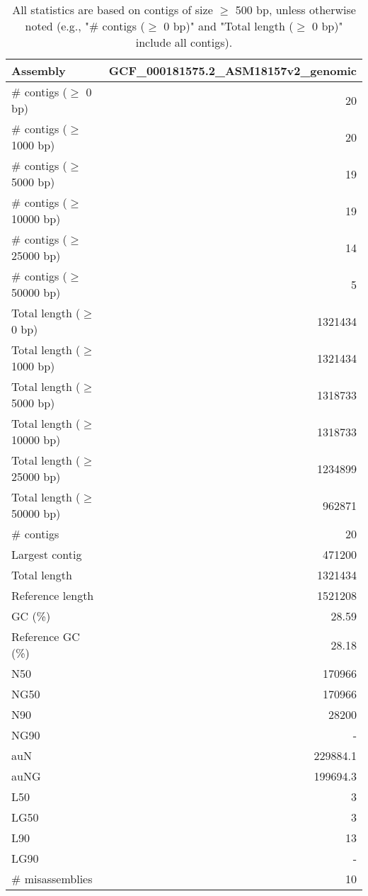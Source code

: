 \documentclass[12pt,a4paper]{article}
\begin{document}
\begin{table}[ht]
\begin{center}
\caption{All statistics are based on contigs of size $\geq$ 500 bp, unless otherwise noted (e.g., "\# contigs ($\geq$ 0 bp)" and "Total length ($\geq$ 0 bp)" include all contigs).}
\begin{tabular}{|l*{1}{|r}|}
\hline
Assembly & GCF\_000181575.2\_ASM18157v2\_genomic \\ \hline
\# contigs ($\geq$ 0 bp) & 20 \\ \hline
\# contigs ($\geq$ 1000 bp) & 20 \\ \hline
\# contigs ($\geq$ 5000 bp) & 19 \\ \hline
\# contigs ($\geq$ 10000 bp) & 19 \\ \hline
\# contigs ($\geq$ 25000 bp) & 14 \\ \hline
\# contigs ($\geq$ 50000 bp) & 5 \\ \hline
Total length ($\geq$ 0 bp) & 1321434 \\ \hline
Total length ($\geq$ 1000 bp) & 1321434 \\ \hline
Total length ($\geq$ 5000 bp) & 1318733 \\ \hline
Total length ($\geq$ 10000 bp) & 1318733 \\ \hline
Total length ($\geq$ 25000 bp) & 1234899 \\ \hline
Total length ($\geq$ 50000 bp) & 962871 \\ \hline
\# contigs & 20 \\ \hline
Largest contig & 471200 \\ \hline
Total length & 1321434 \\ \hline
Reference length & 1521208 \\ \hline
GC (\%) & 28.59 \\ \hline
Reference GC (\%) & 28.18 \\ \hline
N50 & 170966 \\ \hline
NG50 & 170966 \\ \hline
N90 & 28200 \\ \hline
NG90 & - \\ \hline
auN & 229884.1 \\ \hline
auNG & 199694.3 \\ \hline
L50 & 3 \\ \hline
LG50 & 3 \\ \hline
L90 & 13 \\ \hline
LG90 & - \\ \hline
\# misassemblies & 10 \\ \hline

\end{tabular}
\end{center}
\end{table}
\end{document}
